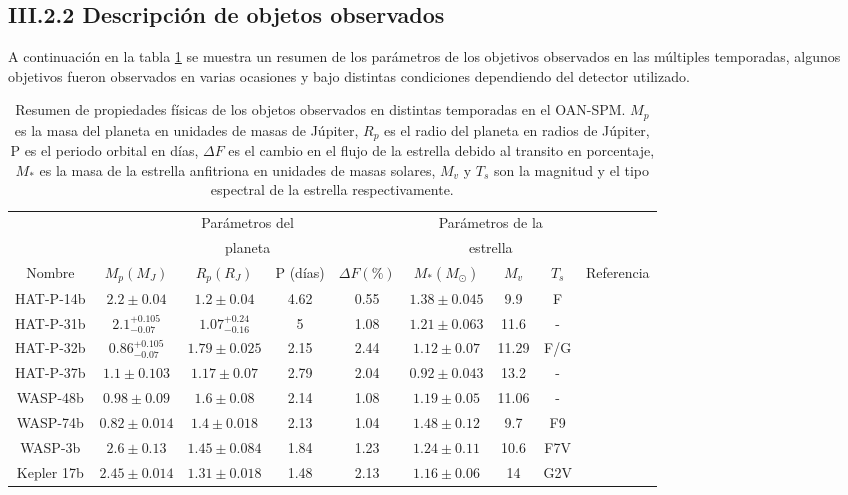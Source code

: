 \subsection*{III.2.2 Descripción de objetos observados}

A continuación en la tabla \ref{tab:tab_objetivos} se muestra un resumen de los parámetros de los objetivos observados en las múltiples temporadas, algunos objetivos fueron observados en varias ocasiones y bajo distintas condiciones dependiendo del detector utilizado.

\begin{table}
\hspace{-1.7cm}
\begin{footnotesize}
\begin{tabular}{ccccccccc}
\hline 
 & \multicolumn{4}{c}{Parámetros del} & \multicolumn{3}{c}{Parámetros de la} &  \\
 & \multicolumn{4}{c}{planeta} & \multicolumn{3}{c}{estrella} & \\
\hline 
Nombre & $M_{p} (M_{J}) $ & $R_{p} (R_{J}) $ &  P (días) & $\Delta F (\%)$ & $M_{*} (M_{\odot})$ & $M_{v}$ & $T_{s}$ & Referencia \\ 
\hline 
HAT-P-14b & $2.2\pm 0.04 $ & $1.2\pm 0.04 $ & 4.62 & 0.55 & $1.38\pm 0.045$ & 9.9 & F & \cite{torres2010hat} \\ 
HAT-P-31b & $2.1^{+0.105}_{-0.07} $ & $1.07^{+0.24}_{-0.16} $ & 5 & 1.08 & $1.21\pm 0.063$ & 11.6 & - & \cite{kipping2011hat} \\
HAT-P-32b & $0.86^{+0.105}_{-0.07} $ & $1.79\pm 0.025 $ & 2.15 & 2.44 & $1.12\pm 0.07$ & 11.29 & F/G & \cite{hartman2011hat} \\  
HAT-P-37b & $1.1\pm 0.103 $ & $1.17\pm 0.07 $ & 2.79 & 2.04 & $0.92\pm 0.043$ & 13.2 & - & \cite{bakos2012hat} \\
WASP-48b & $0.98\pm 0.09 $ & $1.6\pm 0.08 $ & 2.14 & 1.08 & $1.19\pm 0.05$ & 11.06 & - & \cite{enoch2011wasp} \\
WASP-74b & $0.82\pm 0.014 $ & $1.4\pm 0.018 $ & 2.13 & 1.04 & $1.48\pm 0.12$ & 9.7 & F9 & \cite{hellier2015three} \\
WASP-3b & $2.6\pm 0.13 $ & $1.45\pm 0.084 $ & 1.84 & 1.23 & $1.24\pm 0.11$ & 10.6 & F7V & \cite{pollacco2008wasp} \\
Kepler 17b & $2.45\pm 0.014 $ & $1.31\pm 0.018 $ & 1.48 & 2.13 & $1.16\pm 0.06$ & 14 & G2V & \cite{desert2011hot} \\
\hline 
\end{tabular} 
\end{footnotesize}
\caption{Resumen de propiedades físicas de los objetos observados en distintas temporadas en el OAN-SPM. $M_{p}$ es la masa del planeta en unidades de masas de Júpiter, $R_{p}$ es el radio del planeta en radios de Júpiter, P es el periodo orbital en días, $\Delta F$ es el cambio en el flujo de la estrella debido al transito en porcentaje, $M_{*}$ es la masa de la estrella anfitriona en unidades de masas solares, $M_{v}$ y $T_{s}$ son la magnitud y el tipo espectral de la estrella respectivamente.}
\label{tab:tab_objetivos}
\end{table}

